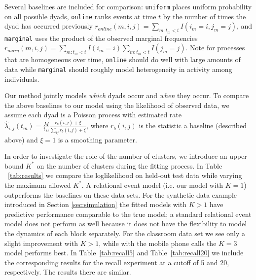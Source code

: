{ \footnotesize



}

Several baselines are included for comparison: \texttt{uniform} places uniform probability on all possible dyads, \texttt{online} ranks events at time $t$ by the number of times the dyad has occurred previously $r_{online}(m,i,j) = \sum_{m:t_m < t} I(i_m=i,j_m=j)$, and \texttt{marginal} uses the product of the observed marginal frequencies $r_{marg}(m,i,j) = \sum_{m:t_m < t} I(i_m=i) \sum_{m:t_m < t} I(j_m=j)$.
Note for processes that are homogeneous over time, \texttt{online} should do well with large amounts of data while \texttt{marginal} should roughly model heterogeneity in activity among individuals.

Our method jointly models \emph{which} dyads occur and \emph{when} they occur.
To compare the above baselines to our model using the likelihood of observed data, we assume each dyad is a Poisson process with estimated  rate $\hat{\lambda}_{i,j}(t_m) = \frac{M}{t_M} \frac{r_{b}(i,j) + \xi}{\sum_{ij} r_{b}(i,j) + \xi}$, where $r_b(i,j)$ is the statistic a baseline (described above) and $\xi=1$ is a smoothing parameter.

In order to investigate the role of the number of clusters, we introduce an upper bound $K^*$ on the number of clusters during the fitting process.  In Table ~\ref{tab:results} we compare the loglikelihood on held-out test data while varying the maximum allowed $K^*$.  A relational event model (i.e. our model with $K=1$) outperforms the baselines on these data sets.  For the synthetic data example introduced in Section \ref{sec:simulation} the fitted models with $K>1$ have predictive performance comparable to the true model; a standard relational event model does not perform as well because it does not have the flexibility to model the dynamics of each block separately.  For the classroom data set we see only a slight improvement with $K>1$, while with the mobile phone calls the $K=3$ model performs best.
In Table~\ref{tab:recall5} and Table~\ref{tab:recall20} we include the corresponding results for the recall experiment at a cutoff of 5 and 20, respectively.  The results there are similar.



